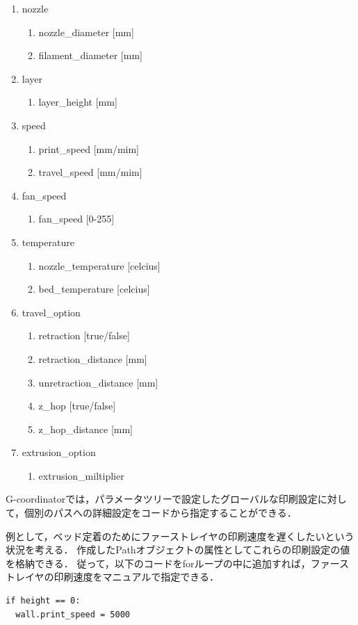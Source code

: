 \documentclass{article}
\begin{document}
\begin{twocolumn}
\begin{enumerate}
  \item nozzle
  \begin{enumerate}
    \item nozzle\_diameter [mm]
    \item filament\_diameter [mm]
  \end{enumerate}
  \item layer
  \begin{enumerate}
    \item layer\_height [mm]
  \end{enumerate}
  \item speed
  \begin{enumerate}
    \item print\_speed [mm/mim]
    \item travel\_speed [mm/mim]
  \end{enumerate}
  \item fan\_speed
  \begin{enumerate}
    \item fan\_speed [0-255]
  \end{enumerate}
  \item temperature
  \begin{enumerate}
    \item nozzle\_temperature [celcius]
    \item bed\_temperature [celcius]
  \end{enumerate}
  \item travel\_option
  \begin{enumerate}
    \item retraction [true/false]
    \item retraction\_distance [mm]
    \item unretraction\_distance [mm]
    \item z\_hop [true/false]
    \item z\_hop\_distance [mm]
  \end{enumerate}
  \item extrusion\_option
  \begin{enumerate}
    \item extrusion\_miltiplier
  \end{enumerate}
\end{enumerate}

G-coordinatorでは，パラメータツリーで設定したグローバルな印刷設定に対して，個別のパスへの詳細設定をコードから指定することができる．

例として，ベッド定着のためにファーストレイヤの印刷速度を遅くしたいという状況を考える．
作成したPathオブジェクトの属性としてこれらの印刷設定の値を格納できる．
従って，以下のコードをforループの中に追加すれば，ファーストレイヤの印刷速度をマニュアルで指定できる．
\begin{lstlisting}
if height == 0:
  wall.print_speed = 5000
\end{lstlisting}


\end{twocolumn}
\end{document}
